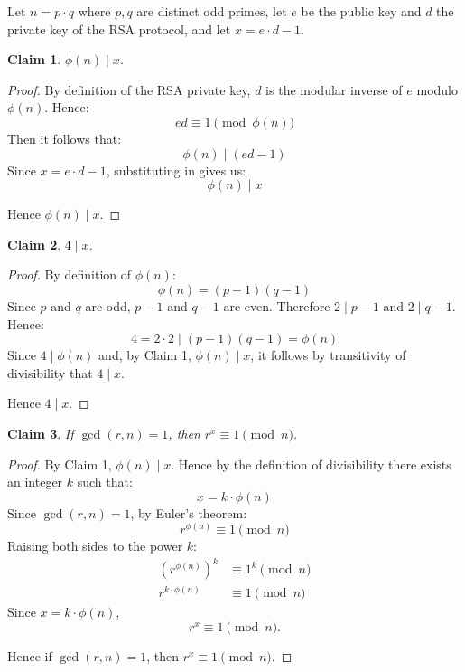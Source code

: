 \documentclass{article}
\newtheorem{claim}{Claim}
\begin{document}
Let $n = p \cdot q$ where $p, q$ are distinct odd primes, let $e$ be the public key and $d$ the private
key of the RSA protocol, and let $x = e \cdot d - 1$.

\begin{claim}
    $\phi(n) \mid x$.
\end{claim}

\begin{proof}
    By definition of the RSA private key, $d$ is the modular inverse of $e$ modulo $\phi(n)$. Hence:
    \[
    ed \equiv 1 \pmod{\phi(n)}
    \]
    Then it follows that:
    \[
    \phi(n) \mid (ed - 1)
    \]
    Since $x = e \cdot d - 1$, substituting in gives us:
    \[
    \phi(n) \mid x
    \]

    \medskip

    Hence $\phi(n) \mid x$.
\end{proof}

\begin{claim}
    $4 \mid x$.
\end{claim}

\begin{proof}
    By definition of $\phi(n)$:
    \[
    \phi(n) = (p - 1)(q - 1)
    \]
    Since $p$ and $q$ are odd, $p - 1$ and $q - 1$ are even. Therefore $2 \mid p - 1$ and $2 \mid q - 1$. Hence:
    \[
    4 = 2 \cdot 2 \mid (p - 1)(q - 1) = \phi(n)
    \]
    Since $4 \mid \phi(n)$ and, by Claim 1, $\phi(n) \mid x$, it follows by transitivity of divisibility 
    that $4 \mid x$.

    \medskip

    Hence $4 \mid x$.
\end{proof}

\begin{claim}
    If $\gcd(r, n) = 1$, then $r^{x} \equiv 1 \pmod{n}$.
\end{claim}

\begin{proof}
    By Claim 1, $\phi(n) \mid x$. Hence by the definition of divisibility there exists an integer $k$ such that:
    \[
    x = k \cdot \phi(n)
    \]
    Since $\gcd(r, n) = 1$, by Euler's theorem:
    \[
    r^{\phi(n)} \equiv 1 \pmod{n}
    \]
    Raising both sides to the power $k$:
    \[
    \begin{aligned}
    (r^{\phi(n)})^{k} &\equiv 1^{k} \pmod{n} \\
    r^{k \cdot \phi(n)} &\equiv 1 \pmod{n}
    \end{aligned}
    \]
    Since $x = k \cdot \phi(n)$,
    \[
    r^{x} \equiv 1 \pmod n.
    \]

    \medskip

    Hence if $\gcd(r, n) = 1$, then $r^{x} \equiv 1 \pmod{n}$.
\end{proof}
\end{document}
